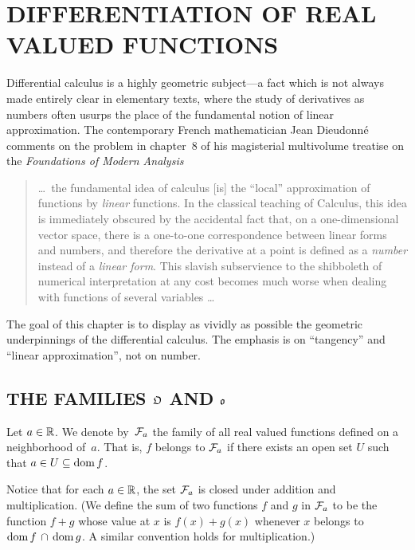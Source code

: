 \chapter{DIFFERENTIATION OF REAL VALUED FUNCTIONS}\label{dorf}

Differential calculus is a highly geometric subject---a fact which is not always made entirely
clear in elementary texts, where the study of derivatives as numbers often usurps the place of
the fundamental notion of linear approximation. The contemporary French mathematician Jean
Dieudonn\'e comments on the problem in chapter~8 of his magisterial multivolume treatise on
the \emph{Foundations of Modern Analysis}\cite{Dieudonne:1962}
 \begin{quote}
\ldots\ the fundamental idea of calculus [is] the ``local'' approximation of functions by
\emph{linear} functions. In the classical teaching of Calculus, this idea is immediately
obscured by the accidental fact that, on a one-dimensional vector space, there is a one-to-one
correspondence between linear forms and numbers, and therefore the derivative at a point is
defined as a \emph{number} instead of a \emph{linear form}.  This slavish subservience to the
shibboleth of numerical interpretation at any cost becomes much worse when dealing with
functions of several variables \ldots
 \end{quote}
The goal of this chapter is to display as vividly as possible the geometric underpinnings of
the differential calculus. The emphasis is on ``tangency'' and ``linear approximation'', not
on number.






\section{THE FAMILIES $\mathfrak{O}$ AND $\mathfrak{o}$}
\begin{notn}  Let $a \in \mathbb{R}$. We denote
by~$\mathcal{F}_a$ the family of all real valued functions defined on a neighborhood of~$a$.  That
is, $f$ belongs to $\mathcal{F}_a$ if there exists an open set $U$ such that $a \in U \subseteq
\operatorname{dom} f$.
\end{notn}

Notice that for each $a \in \mathbb{R}$, the set $\mathcal{F}_a$ is closed under addition and
multiplication. (We define the sum of two functions $f$ and $g$ in $\mathcal{F}_a$ to be the
function $f + g$ whose value at $x$ is $f(x) + g(x)$ whenever $x$ belongs to $\operatorname{dom} f \,\cap\,
\operatorname{dom} g$.  A similar convention holds for multiplication.)

